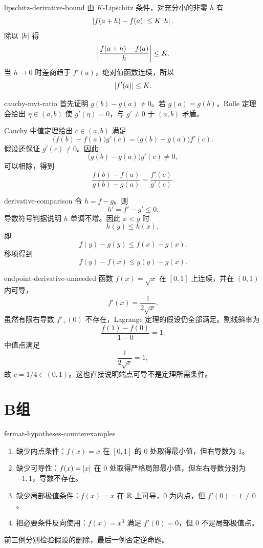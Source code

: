 \begin{solution}{lipschitz-derivative-bound}
由 \(K\)-Lipschitz 条件，对充分小的非零 \(h\) 有
\[
 \left|f(a+h)-f(a)\right|\le K\left|h\right|.
\]
除以 \(\left|h\right|\) 得
\[
 \left|\frac{f(a+h)-f(a)}h\right|\le K.
\]
当 \(h\to0\) 时差商趋于 \(f'(a)\)，绝对值函数连续，所以
\[
 \left|f'(a)\right|\le K.
\]
\end{solution}

\begin{solution}{cauchy-mvt-ratio}
首先证明 \(g(b)-g(a)\ne0\)。若 \(g(a)=g(b)\)，Rolle 定理会给出 \(\eta\in(a,b)\) 使 \(g'(\eta)=0\)，与 \(g'\ne0\) 于 \((a,b)\) 矛盾。

Cauchy 中值定理给出 \(c\in(a,b)\) 满足
\[
 \bigl(f(b)-f(a)\bigr)g'(c)
 =
 \bigl(g(b)-g(a)\bigr)f'(c).
\]
假设还保证 \(g'(c)\ne0\)。因此
\[
 \bigl(g(b)-g(a)\bigr)g'(c)\ne0,
\]
可以相除，得到
\[
 \frac{f(b)-f(a)}{g(b)-g(a)}
 =
 \frac{f'(c)}{g'(c)}.
\]
\end{solution}

\begin{solution}{derivative-comparison}
令 \(h=f-g\)。则
\[
 h'=f'-g'\le0.
\]
导数符号判据说明 \(h\) 单调不增。因此 \(x<y\) 时
\[
 h(y)\le h(x),
\]
即
\[
 f(y)-g(y)\le f(x)-g(x).
\]
移项得到
\[
 f(y)-f(x)\le g(y)-g(x).
\]
\end{solution}

\begin{solution}{endpoint-derivative-unneeded}
函数 \(f(x)=\sqrt x\) 在 \([0,1]\) 上连续，并在 \((0,1)\) 内可导，
\[
 f'(x)=\frac1{2\sqrt x}.
\]
虽然有限右导数 \(f'_+(0)\) 不存在，Lagrange 定理的假设仍全部满足。割线斜率为
\[
 \frac{f(1)-f(0)}{1-0}=1.
\]
中值点满足
\[
 \frac1{2\sqrt c}=1,
\]
故 \(c=1/4\in(0,1)\)。这也直接说明端点可导不是定理所需条件。
\end{solution}

\section*{B组}

\begin{solution}{fermat-hypotheses-counterexamples}
\begin{enumerate}
 \item 缺少内点条件：\(f(x)=x\) 在 \([0,1]\) 的 \(0\) 处取得最小值，但右导数为 \(1\)。
 \item 缺少可导性：\(f(x)=\left|x\right|\) 在 \(0\) 处取得严格局部最小值，但左右导数分别为 \(-1,1\)，导数不存在。
 \item 缺少局部极值条件：\(f(x)=x\) 在 \(\mathbb{R}\) 上可导，\(0\) 为内点，但 \(f'(0)=1\ne0\)。
 \item 把必要条件反向使用：\(f(x)=x^3\) 满足 \(f'(0)=0\)，但 \(0\) 不是局部极值点。
\end{enumerate}
前三例分别检验假设的删除，最后一例否定逆命题。
\end{solution}

